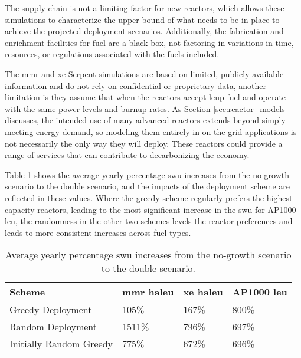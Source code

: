 The supply chain is not a limiting factor for new reactors, which allows these simulations to characterize the upper bound of what needs to be in place to achieve the projected deployment scenarios. Additionally, the fabrication and enrichment facilities for fuel are a black box, not factoring in variations in time, resources, or regulations associated with the fuels included.

The \gls{mmr} and \gls{xe} Serpent simulations are based on limited, publicly available information and do not rely on confidential or proprietary data, another limitation is they assume that when the reactors accept \gls{leup} fuel and operate with the same power levels and burnup rates. As Section \ref{sec:reactor_models} discusses, the intended use of many advanced reactors extends beyond simply meeting energy demand, so modeling them entirely in on-the-grid applications is not necessarily the only way they will deploy. These reactors could provide a range of services that can contribute to decarbonizing the economy.

Table \ref{tab:swu_incs} shows the average yearly percentage \gls{swu} increases from the no-growth scenario to the double scenario, and the impacts of the deployment scheme are reflected in these values. Where the greedy scheme regularly prefers the highest capacity reactors, leading to the most significant increase in the \gls{swu} for AP1000 \gls{leu}, the randomness in the other two schemes levels the reactor preferences and leads to more consistent increases across fuel types.

\begin{table}[H]
    \centering
    \caption{Average yearly percentage \gls{swu} increases from the no-growth scenario to the double scenario.}
    \label{tab:swu_incs}
    \begin{tabular}{l l l l}
        \hline
        Scheme & \gls{mmr} \gls{haleu} & \gls{xe} \gls{haleu} & AP1000 \gls{leu}\\
        \hline
        Greedy Deployment & 105\% & 167\% & 800\% \\
        Random Deployment & 1511\% & 796\% & 697\% \\
        Initially Random Greedy & 775\% & 672\% & 696\% \\
        \hline
    \end{tabular}
\end{table}


